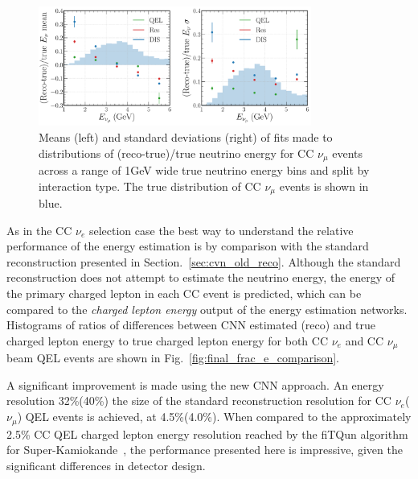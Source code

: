 \begin{figure} %
    \includegraphics[width=0.8\textwidth]{diagrams/6-cvn/chipsnet/final_energy_numu.pdf}
    \caption[Means and standard deviations of fits to $\nu_{\mu}$ energy distributions.]
    {Means (left) and standard deviations (right) of fits made to distributions of
        (reco-true)/true neutrino energy for CC $\nu_{\mu}$ events across a range of \unit{1}{GeV}
        wide true neutrino energy bins and split by interaction type. The true distribution of CC
        $\nu_{\mu}$ events is shown in blue.}
    \label{fig:final_energy_numu}
\end{figure}

As in the CC $\nu_{e}$ selection case the best way to understand the relative performance of the
energy estimation is by comparison with the standard reconstruction presented in
Section.~\ref{sec:cvn_old_reco}. Although the standard reconstruction does not attempt to estimate
the neutrino energy, the energy of the primary charged lepton in each CC event is predicted, which
can be compared to the \emph{charged lepton energy} output of the energy estimation networks.
Histograms of ratios of differences between CNN estimated (reco) and true charged lepton energy to
true charged lepton energy for both CC $\nu_{e}$ and CC $\nu_{\mu}$ beam QEL events are shown in
Fig.~\ref{fig:final_frac_e_comparison}.

A significant improvement is made using the new CNN approach. An energy resolution 32\%(40\%) the
size of the standard reconstruction resolution for CC $\nu_{e}$($\nu_{\mu}$) QEL events is
achieved, at 4.5\%(4.0\%). When compared to the approximately 2.5\% CC QEL charged lepton energy
resolution reached by the fiTQun algorithm for Super-Kamiokande~\cite{jiang2019}, the performance
presented here is impressive, given the significant differences in detector design.

